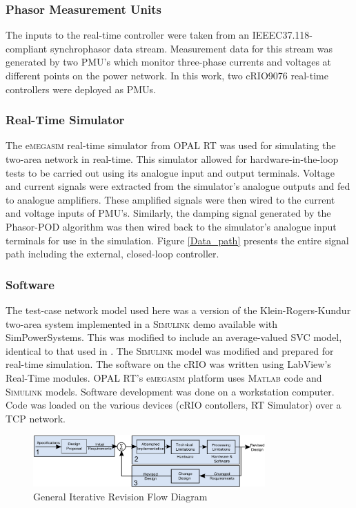 \documentclass[conference]{IEEEtran}
\begin{document}
\subsubsection*{Phasor Measurement Units}
The inputs to the real-time controller were taken from an IEEEC37.118-compliant synchrophasor data stream. Measurement data for this stream was generated by two PMU's which monitor three-phase currents and voltages at different points on the power network. In this work, two cRIO9076 real-time controllers \cite{cRIO9076} were deployed as PMUs\cite{PMUMario}.

\subsubsection*{Real-Time Simulator}
The e\textsc{megasim} real-time simulator from OPAL RT \cite{eMEGASIM} was used for simulating the two-area network in real-time. This simulator allowed for hardware-in-the-loop tests to be carried out using its analogue input and output terminals. Voltage and current signals were extracted from the simulator's analogue outputs and fed to analogue amplifiers. These amplified signals were then wired to the current and voltage inputs of PMU's. Similarly, the damping signal generated by the Phasor-POD algorithm was then wired back to the simulator's analogue input terminals for use in the simulation. Figure \ref{Data_path} presents the entire signal path including the external, closed-loop controller.

\subsubsection*{Software}
The test-case network model used here was a version of the Klein-Rogers-Kundur two-area system implemented in a \textsc{Simulink} demo available with SimPowerSystems\cite{SIMULINKOnline}. This was modified to include an average-valued SVC model, identical to that used in \cite{PhasorPODImplement}. The \textsc{Simulink} model was modified and prepared for real-time simulation. The software on the cRIO was written using LabView's Real-Time modules. OPAL RT's e\textsc{megasim} platform uses \textsc{Matlab} code and \textsc{Simulink} models. Software development was done on a workstation computer. Code was loaded on the various devices (cRIO contollers, RT Simulator) over a TCP network.

\begin{figure}[!t]
\centering
\includegraphics[width=3.5in]{RevisionFlow.png} 
\caption{General Iterative Revision Flow Diagram}
\label{fig:RevisionFlow}
\end{figure}
\end{document}
